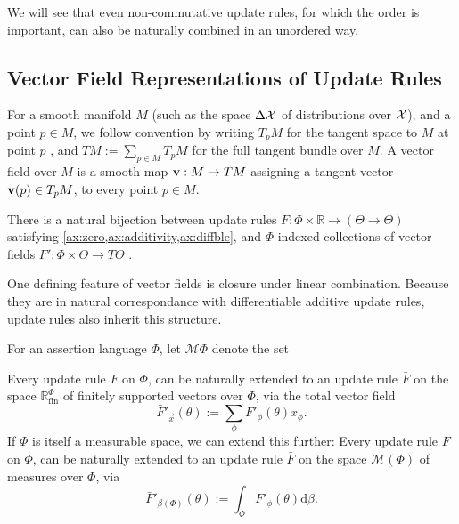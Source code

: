 \documentclass{article}
\newcommand{\ext}[1]{\mathcal M#1} %
\begin{document}
We will see that even non-commutative update rules, for which the order is important, can also be naturally combined in an unordered way.

\subsection{Vector Field Representations of Update Rules}
    \label{sec:vecrep}
For a smooth manifold $M$
(such as the space $\Delta \mathcal X$ of distributions over $\mathcal X$),
and a point $p \in M$, we follow convention by writing $T_p M$ for the tangent space to $M$ at point $p$ \parencite{lee2013smooth}, and %
$TM := \sum_{p \in M} T_p M$ for the full tangent bundle over $M$.
%
A vector field over $M$ is a smooth map $\mathbf{v} : M \to T M$ assigning a tangent vector $\mathbf{v}(p) \in T_p M$, to every point $p \in M$.

\begin{theorem}\label{thm:vecrep}
    There is a natural bijection between
    update rules $F : \Phi \times \mathbb R \to (\Theta  \to \Theta)$
        satisfying \cref{ax:zero,ax:additivity,ax:diffble},
    and $\Phi$-indexed collections of vector fields
        $ F' :  \Phi \times \Theta \to T \Theta$%
    .
\end{theorem}

One defining feature of vector fields is closure under linear
    combination.
Because they are in natural correspondance with differentiable additive update rules, update rules also inherit this structure.


\begin{defn}
    For an assertion language $\Phi$, let $\ext\Phi$ denote the set
\end{defn}


\begin{prop}
    Every  update rule $F$ on $\Phi$, can be naturally extended to an update rule
    $\bar F$ on
    the space $\mathbb R^{\Phi}_{\mathrm{fin}}$ of finitely supported vectors over $\Phi$,
    via the total vector field
    \[
        \bar F'_{\vec{x}}( \theta ) := \sum_{\phi} F'_\phi(\theta) x_\phi.
    \]
%
If $\Phi$ is itself a measurable space, we can extend this further:
    Every  update rule $F$ on $\Phi$, can be naturally extended to an update rule
    $\bar F$ on
    the space $\mathcal M(\Phi)$ of measures over $\Phi$,
    via
    \[
        \bar F'_{\beta(\Phi)}( \theta ) := \int_{\Phi} F'_\phi(\theta) \mathrm d\beta.
    \]
\end{prop}
\end{document}
